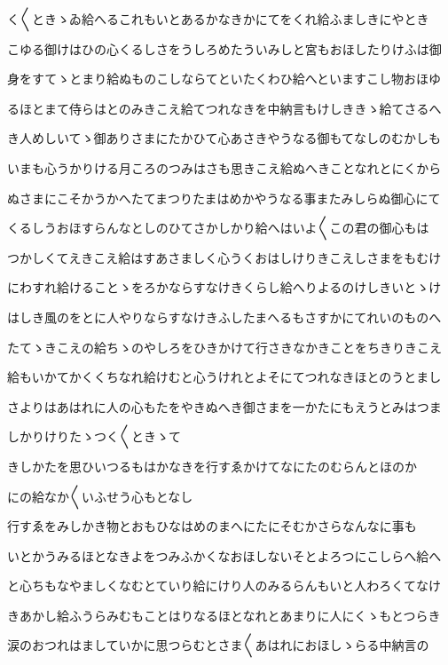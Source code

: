 \documentclass[a4paper,11pt,landscape]{ltjtarticle}
\begin{document}
\par\medskip
く〱ときゝゐ給へるこれもいとあるかなきかにてをくれ給ふましきにやとき
\par\medskip
こゆる御けはひの心くるしさをうしろめたういみしと宮もおほしたりけふは御
\par\medskip
身をすてゝとまり給ぬものこしならてといたくわひ給へといますこし物おほゆ
\par\medskip
るほとまて侍らはとのみきこえ給てつれなきを中納言もけしききゝ給てさるへ
\par\medskip
き人めしいてゝ御ありさまにたかひて心あさきやうなる御もてなしのむかしも
\par\medskip
いまも心うかりける月ころのつみはさも思きこえ給ぬへきことなれとにくから
\par\medskip
ぬさまにこそかうかへたてまつりたまはめかやうなる事またみしらぬ御心にて
\par\medskip
くるしうおほすらんなとしのひてさかしかり給へはいよ〱この君の御心もは
\par\medskip
つかしくてえきこえ給はすあさましく心うくおはしけりきこえしさまをもむけ
\par\medskip
にわすれ給けることゝをろかならすなけきくらし給へりよるのけしきいとゝけ
\par\medskip
はしき風のをとに人やりならすなけきふしたまへるもさすかにてれいのものへ
\par\medskip
たてゝきこえの給ちゝのやしろをひきかけて行さきなかきことをちきりきこえ
\par\medskip
給もいかてかくくちなれ給けむと心うけれとよそにてつれなきほとのうとまし
\par\medskip
さよりはあはれに人の心もたをやきぬへき御さまを一かたにもえうとみはつま
\par\medskip
しかりけりたゝつく〱ときゝて
\par\medskip
きしかたを思ひいつるもはかなきを行すゑかけてなにたのむらんとほのか
\par\medskip
にの給なか〱いふせう心もとなし
\par\medskip
行すゑをみしかき物とおもひなはめのまへにたにそむかさらなんなに事も
\par\medskip
いとかうみるほとなきよをつみふかくなおほしないそとよろつにこしらへ給へ
\par\medskip
と心ちもなやましくなむとていり給にけり人のみるらんもいと人わろくてなけ
\par\medskip
きあかし給ふうらみむもことはりなるほとなれとあまりに人にくゝもとつらき
\par\medskip
涙のおつれはましていかに思つらむとさま〱あはれにおほしゝらる中納言の
\end{document}
